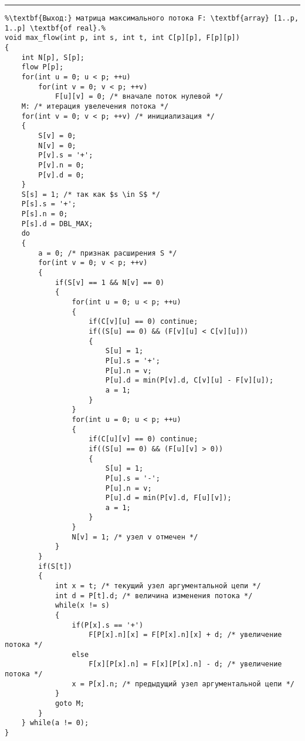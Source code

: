 \vspace{5pt} \hrule
\begin{lstlisting}[caption={Нахождение максимального потока}, label=p279_max_flow, escapechar=\%]
%\noindent\textbf{Вход:} сеть G(V, E) с источником s и стоком t, заданная матрицей пропускных способностей C: \textbf{array} [1..p, 1..p] \textbf{of real}.\\%
%\textbf{Выход:} матрица максимального потока F: \textbf{array} [1..p, 1..p] \textbf{of real}.%
void max_flow(int p, int s, int t, int C[p][p], F[p][p])
{
	int N[p], S[p];
	flow P[p];
	for(int u = 0; u < p; ++u)
		for(int v = 0; v < p; ++v)
			F[u][v] = 0; /* вначале поток нулевой */
	M: /* итерация увелечения потока */
	for(int v = 0; v < p; ++v) /* инициализация */
	{
		S[v] = 0;
		N[v] = 0;
		P[v].s = '+';
		P[v].n = 0;
		P[v].d = 0;
	}
	S[s] = 1; /* так как $s \in S$ */
	P[s].s = '+';
	P[s].n = 0;
	P[s].d = DBL_MAX;
	do
	{
		a = 0; /* признак расширения S */
		for(int v = 0; v < p; ++v)
		{
			if(S[v] == 1 && N[v] == 0)
			{
				for(int u = 0; u < p; ++u)
				{
					if(C[v][u] == 0) continue;
					if((S[u] == 0) && (F[v][u] < C[v][u]))
	  				{
						S[u] = 1;
						P[u].s = '+';
						P[u].n = v;
						P[u].d = min(P[v].d, C[v][u] - F[v][u]);
						a = 1;
					}
				}
				for(int u = 0; u < p; ++u)
				{
					if(C[u][v] == 0) continue;
					if((S[u] == 0) && (F[u][v] > 0))
					{
						S[u] = 1;
						P[u].s = '-';
						P[u].n = v;
						P[u].d = min(P[v].d, F[u][v]);
						a = 1;
					}
				}
				N[v] = 1; /* узел v отмечен */
			}
		}
		if(S[t])
		{
			int x = t; /* текущий узел аргументальной цепи */
			int d = P[t].d; /* величина изменения потока */
			while(x != s)
			{
				if(P[x].s == '+')
					F[P[x].n][x] = F[P[x].n][x] + d; /* увеличение потока */
				else
					F[x][P[x].n] = F[x][P[x].n] - d; /* увеличение потока */
				x = P[x].n; /* предыдущий узел аргументальной цепи */
			}
			goto M;
		}
	} while(a != 0);
}
\end{lstlisting}
